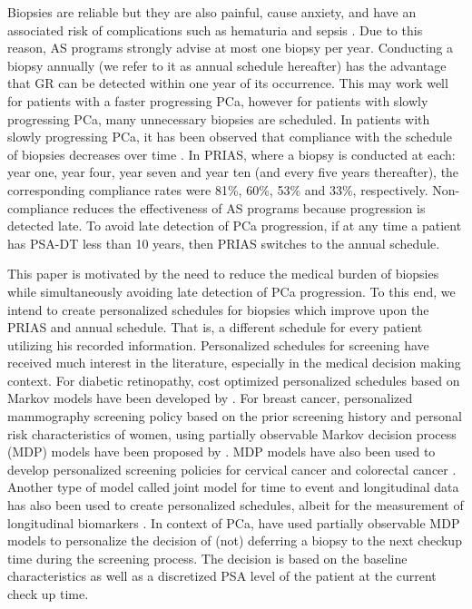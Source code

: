 Biopsies are reliable but they are also painful, cause anxiety, and have an associated risk of complications such as hematuria and sepsis \citep{loeb2013systematic}. Due to this reason, AS programs strongly advise at most one biopsy per year. Conducting a biopsy annually (we refer to it as annual schedule hereafter) has the advantage that GR can be detected within one year of its occurrence. This may work well for patients with a faster progressing PCa, however for patients with slowly progressing PCa, many unnecessary biopsies are scheduled. In patients with slowly progressing PCa, it has been observed that compliance with the schedule of biopsies decreases over time \citep{bokhorst2015compliance}. In PRIAS, where a biopsy is conducted at each: year one, year four, year seven and year ten (and every five years thereafter), the corresponding compliance rates were 81\%, 60\%, 53\% and 33\%, respectively. Non-compliance reduces the effectiveness of AS programs because progression is detected late. To avoid late detection of PCa progression, if at any time a patient has PSA-DT less than 10 years, then PRIAS switches to the annual schedule. 

This paper is motivated by the need to reduce the medical burden of biopsies while simultaneously avoiding late detection of PCa progression. To this end, we intend to create personalized schedules for biopsies which improve upon the PRIAS and annual schedule. That is, a different schedule for every patient utilizing his recorded information. Personalized schedules for screening have received much interest in the literature, especially in the medical decision making context. For diabetic retinopathy, cost optimized personalized schedules based on Markov models have been developed by \citet{bebu2017OptimalScreening}. For breast cancer, personalized mammography screening policy based on the prior screening history and personal risk characteristics of women, using partially observable Markov decision process (MDP) models have been proposed by \citet*{ayer2012or}. MDP models have also been used to develop personalized screening policies for cervical cancer \citep*{akhavan2017markov} and colorectal cancer \citep*{erenay2014optimizing}. Another type of model called joint model for time to event and longitudinal data \citep{tsiatis2004joint,rizopoulos2012joint} has also been used to create personalized schedules, albeit for the measurement of longitudinal biomarkers \citep{drizopoulosPersScreening}. In context of PCa, \citet{zhang2012optimization} have used partially observable MDP models to personalize the decision of (not) deferring a biopsy to the next checkup time during the screening process. The decision is based on the baseline characteristics as well as a discretized PSA level of the patient at the current check up time.

